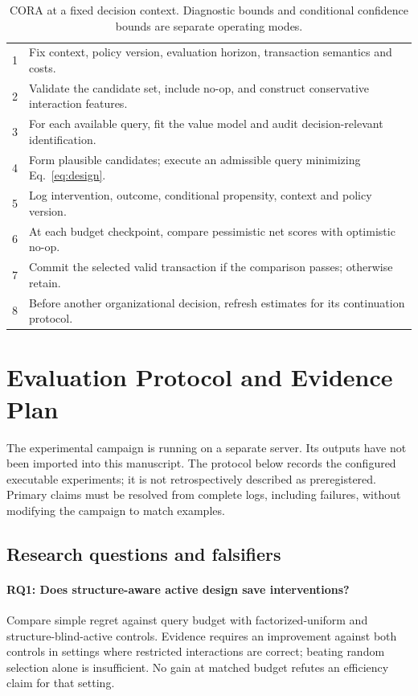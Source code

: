 \documentclass[runningheads]{llncs}
\begin{document}
\begin{table}[t]
    \caption{CORA at a fixed decision context. Diagnostic bounds and conditional confidence bounds are separate operating modes.}\label{tab:algorithm}
    \begin{tabularx}{\textwidth}{@{}rX@{}}\toprule
        1 & Fix context, policy version, evaluation horizon, transaction semantics and costs.           \\
        2 & Validate the candidate set, include no-op, and construct conservative interaction features. \\
        3 & For each available query, fit the value model and audit decision-relevant identification.   \\
        4 & Form plausible candidates; execute an admissible query minimizing Eq.~\eqref{eq:design}.    \\
        5 & Log intervention, outcome, conditional propensity, context and policy version.              \\
        6 & At each budget checkpoint, compare pessimistic net scores with optimistic no-op.            \\
        7 & Commit the selected valid transaction if the comparison passes; otherwise retain.           \\
        8 & Before another organizational decision, refresh estimates for its continuation protocol.    \\\bottomrule
    \end{tabularx}\end{table}

\section{Evaluation Protocol and Evidence Plan}\label{sec:evaluation}
The experimental campaign is running on a separate server. Its outputs have not been imported into this manuscript. The protocol below records the configured executable experiments; it is not retrospectively described as preregistered. Primary claims must be resolved from complete logs, including failures, without modifying the campaign to match examples.

\subsection{Research questions and falsifiers}
\paragraph{RQ1: Does structure-aware active design save interventions?}
Compare simple regret against query budget with factorized-uniform and structure-blind-active controls. Evidence requires an improvement against both controls in settings where restricted interactions are correct; beating random selection alone is insufficient. No gain at matched budget refutes an efficiency claim for that setting.
\end{document}
